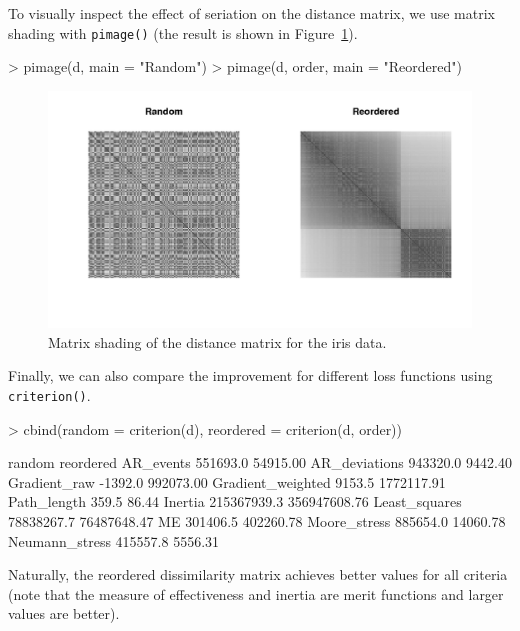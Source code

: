 \documentclass[fleqn, a4paper]{article}
\newcommand{\func}[1]{\mbox{\texttt{#1()}}}
\begin{document}
To visually inspect the effect of seriation on the distance matrix, we use
matrix shading with \func{pimage} (the result is shown in 
Figure~\ref{fig:pimage1}).

\begin{Schunk}
\begin{Sinput}
> pimage(d, main = "Random")
> pimage(d, order, main = "Reordered")
\end{Sinput}
\end{Schunk}
\begin{figure}
    \centering
    \includegraphics[width=12cm]{seriation-pimage1}
    \caption{Matrix shading of the  distance matrix for the iris data.}
    \label{fig:pimage1}
\end{figure}

Finally, we can also compare the improvement for different loss functions
using \func{criterion}.

\begin{Schunk}
\begin{Sinput}
> cbind(random = criterion(d), reordered = criterion(d, order))
\end{Sinput}
\begin{Soutput}
                       random    reordered
AR_events            551693.0     54915.00
AR_deviations        943320.0      9442.40
Gradient_raw          -1392.0    992073.00
Gradient_weighted      9153.5   1772117.91
Path_length             359.5        86.44
Inertia           215367939.3 356947608.76
Least_squares      78838267.7  76487648.47
ME                   301406.5    402260.78
Moore_stress         885654.0     14060.78
Neumann_stress       415557.8      5556.31
\end{Soutput}
\end{Schunk}

Naturally, the reordered dissimilarity matrix achieves better values for all
criteria (note that the measure of effectiveness and inertia 
are merit functions and larger values are better).
\end{document}
